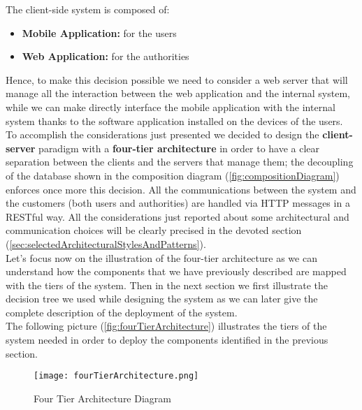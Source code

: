 		The client-side system is composed of:
		
		\begin{itemize}
			\item \textbf{Mobile Application:} for the users
			\item \textbf{Web Application:} for the authorities
		\end{itemize}
			
		Hence, to make this decision possible we need to consider a web server that will manage all the interaction between the web application and the internal system, while we can make directly interface the mobile application with the internal system thanks to the software application installed on the devices of the users.\\
		
		To accomplish the considerations just presented we decided to design the \textbf{client-server} paradigm with a \textbf{four-tier architecture} in order to have a clear separation between the clients and the servers that manage them; the decoupling of the database shown in the composition diagram (\autoref{fig:compositionDiagram}) enforces once more this decision. All the communications between the system and the customers (both users and authorities) are handled via HTTP messages in a RESTful way. All the considerations just reported about some architectural and communication choices will be clearly precised in the devoted section (\ref{sec:selectedArchitecturalStylesAndPatterns}).\\
		
		Let's focus now on the illustration of the four-tier architecture as we can understand how the components that we have previously described are mapped with the tiers of the system. Then in the next section we first illustrate the decision tree we used while designing the system as we can later give the complete description of the deployment of the system.\\
		
		The following picture (\autoref{fig:fourTierArchitecture}) illustrates the tiers of the system needed in order to deploy the components identified in the previous section. 
		
		\vspace{0.3cm}
		
		\begin{figure}[h!]
			\centering
			\texttt{[image: fourTierArchitecture.png]}
			\caption{\label{fig:fourTierArchitecture} Four Tier Architecture Diagram}
		\end{figure}
		
